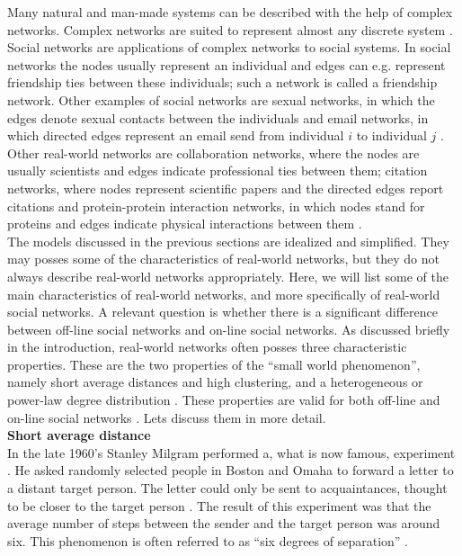 \documentclass[11 pt , letterpaper , twoside , openright]{book}
\begin{document}
Many natural and man-made systems can be described with the help of complex networks. Complex networks are suited to represent almost any discrete system \cite{Costa2008}. Social networks are applications of complex networks to social systems. In social networks the nodes usually represent an individual and edges can e.g. represent friendship ties between these individuals; such a network is called a friendship network. Other examples of social networks are sexual networks, in which the edges denote sexual contacts between the individuals and email networks, in which directed edges represent an email send from individual $i$ to individual $j$ \cite{Costa2008}. Other real-world networks are collaboration networks, where the nodes are usually scientists and edges indicate professional ties between them; citation networks, where nodes represent scientific papers and the directed edges report citations and protein-protein interaction networks, in which nodes stand for proteins and edges indicate physical interactions between them \cite{Costa2008}.\\
\newline
The models discussed in the previous sections are idealized and simplified. They may posses some of the characteristics of real-world networks, but they do not always describe real-world networks appropriately. Here, we will list some of the main characteristics of real-world networks, and more specifically of real-world social networks. A relevant question is whether there is a significant difference between off-line social networks and on-line social networks.
\newpage
\noindent
As discussed briefly in the introduction, real-world networks often posses three characteristic properties. These are the two properties of the ``small world phenomenon'', namely short average distances and high clustering, and a heterogeneous or power-law degree distribution \cite{RealWorld}. These properties are valid for both off-line and on-line social networks \cite{Zhang2014}. Lets discuss them in more detail.\\
\newline
\textbf{Short average distance}\\
\newline
In the late 1960's Stanley Milgram performed a, what is now famous, experiment \cite{Newman2003}. He asked randomly selected people in Boston and Omaha to forward a letter to a distant target person. The letter could only be sent to acquaintances, thought to be closer to the target person \cite{RealWorld}. The result of this experiment was that the average number of steps between the sender and the target person was around six. This phenomenon is often referred to as ``six degrees of separation'' \cite{RealWorld}.\\
\end{document}
